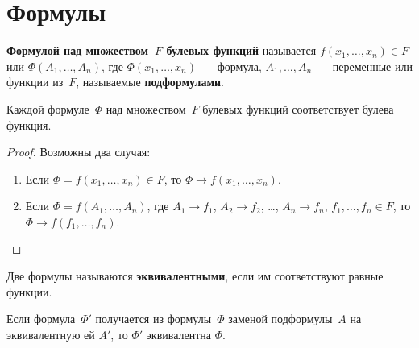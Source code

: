 \section{Формулы}
 \textbf{Формулой над множеством~$F$ булевых функций} называется $f(x_1, \ldots, x_n) \in F$ или $\Phi(A_1, \ldots, \allowbreak A_n)$, где $\Phi(x_1, \ldots, x_n)$~--- формула, $A_1, \ldots, A_n$~--- переменные или функции из~$F$, называемые \textbf{подформулами}.

\begin{statement}
Каждой формуле~$\Phi$ над множеством~$F$ булевых функций соответствует булева функция.
\end{statement}
\begin{proof}
Возможны два случая:
\begin{enumerate}
	\item Если $\Phi = f(x_1, \ldots, x_n) \in F$, то $\Phi \to f(x_1, \ldots, x_n)$.
	\item Если $\Phi = f(A_1, \ldots, A_n)$, где $A_1 \to f_1$, $A_2 \to f_2$, \ldots, $A_n \to f_n$, $f_1, \ldots, f_n \in F$, то $\Phi \to f(f_1, \ldots, f_n)$.
\end{enumerate}
\end{proof}

Две формулы называются \textbf{эквивалентными}, если им соответствуют равные функции.

\begin{statement}
Если формула~$\Phi'$ получается из формулы~$\Phi$ заменой подформулы~$A$ на эквивалентную ей $A'$, то $\Phi'$ эквивалентна $\Phi$.
\end{statement}